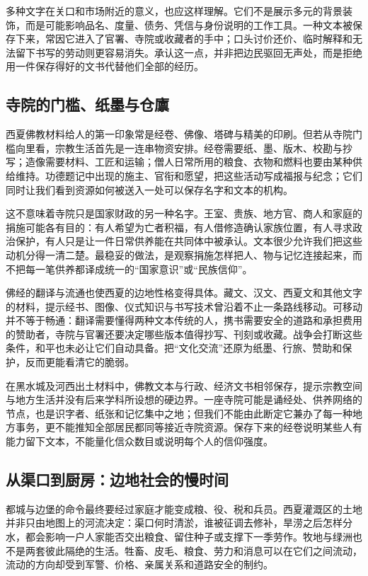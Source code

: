 多种文字在关口和市场附近的意义，也应这样理解。它们不是展示多元的背景装饰，而是可能影响品名、度量、债务、凭信与身份说明的工作工具。一种文本被保存下来，常因它进入了官署、寺院或收藏者的手中；口头讨价还价、临时解释和无法留下书写的劳动则更容易消失。承认这一点，并非把边民驱回无声处，而是拒绝用一件保存得好的文书代替他们全部的经历。

\subsection{寺院的门槛、纸墨与仓廪}

西夏佛教材料给人的第一印象常是经卷、佛像、塔碑与精美的印刷。但若从寺院门槛向里看，宗教生活首先是一连串物资安排。经卷需要纸、墨、版木、校勘与抄写；造像需要材料、工匠和运输；僧人日常所用的粮食、衣物和燃料也要由某种供给维持。功德题记中出现的施主、官衔和愿望，把这些活动写成福报与纪念；它们同时让我们看到资源如何被送入一处可以保存名字和文本的机构。

这不意味着寺院只是国家财政的另一种名字。王室、贵族、地方官、商人和家庭的捐施可能各有目的：有人希望为亡者积福，有人借修造确认家族位置，有人寻求政治保护，有人只是让一件日常供养能在共同体中被承认。文本很少允许我们把这些动机分得一清二楚。最稳妥的做法，是观察捐施怎样把人、物与记忆连接起来，而不把每一笔供养都译成统一的“国家意识”或“民族信仰”。

佛经的翻译与流通也使西夏的边地性格变得具体。藏文、汉文、西夏文和其他文字的材料，提示经书、图像、仪式知识与书写技术曾沿着不止一条路线移动。可移动并不等于畅通：翻译需要懂得两种文本传统的人，携书需要安全的道路和承担费用的赞助者，寺院与官署还要决定哪些版本值得抄写、刊刻或收藏。战争会打断这些条件，和平也未必让它们自动具备。把“文化交流”还原为纸墨、行旅、赞助和保护，反而更能看清它的脆弱。

在黑水城及河西出土材料中，佛教文本与行政、经济文书相邻保存，提示宗教空间与地方生活并没有后来学科所设想的硬边界。一座寺院可能是诵经处、供养网络的节点，也是识字者、纸张和记忆集中之地；但我们不能由此断定它兼办了每一种地方事务，更不能推知全部居民都同等接近寺院资源。保存下来的经卷说明某些人有能力留下文本，不能量化信众数目或说明每个人的信仰强度。

\subsection{从渠口到厨房：边地社会的慢时间}

都城与边堡的命令最终要经过家庭才能变成粮、役、税和兵员。西夏灌溉区的土地并非只由地图上的河流决定：渠口何时清淤，谁被征调去修补，旱涝之后怎样分水，都会影响一户人家能否交出粮食、留住种子或支撑下一季劳作。牧地与绿洲也不是两套彼此隔绝的生活。牲畜、皮毛、粮食、劳力和消息可以在它们之间流动，流动的方向却受到军警、价格、亲属关系和道路安全的制约。


